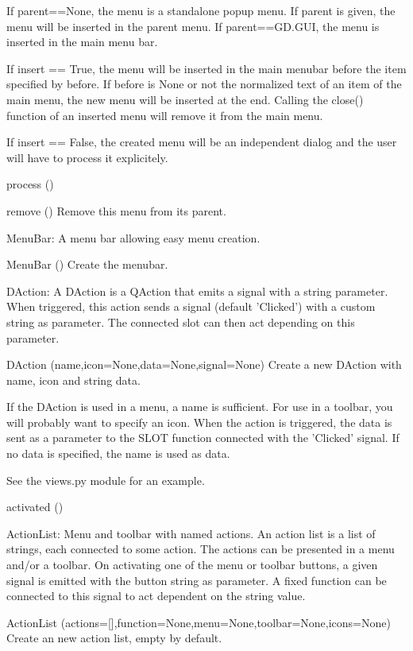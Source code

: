         If parent==None, the menu is a standalone popup menu.
        If parent is given, the menu will be inserted in the parent menu.
        If parent==GD.GUI, the menu is inserted in the main menu bar.
        
        If insert == True, the menu will be inserted in the main menubar
        before the item specified by before.
        If before is None or not the normalized text of an item of the
        main menu, the new menu will be inserted at the end.
        Calling the close() function of an inserted menu will remove it
        from the main menu.

        If insert == False, the created menu will be an independent dialog
        and the user will have to process it explicitely.
        

process ()


remove ()
Remove this menu from its parent.

MenuBar: A menu bar allowing easy menu creation.

MenuBar ()
Create the menubar.

DAction: A DAction is a QAction that emits a signal with a string parameter.
    When triggered, this action sends a signal (default 'Clicked') with a
    custom string as parameter. The connected slot can then act depending
    on this parameter.
    
DAction (name,icon=None,data=None,signal=None)
Create a new DAction with name, icon and string data.

        If the DAction is used in a menu, a name is sufficient. For use
        in a toolbar, you will probably want to specify an icon.
        When the action is triggered, the data is sent as a parameter to
        the SLOT function connected with the 'Clicked' signal.
        If no data is specified, the name is used as data. 
        
        See the views.py module for an example.
        

activated ()


ActionList: Menu and toolbar with named actions.
    An action list is a list of strings, each connected to some action.
    The actions can be presented in a menu and/or a toolbar.
    On activating one of the menu or toolbar buttons, a given signal is
    emitted with the button string as parameter. A fixed function can be
    connected to this signal to act dependent on the string value.
    
ActionList (actions=[],function=None,menu=None,toolbar=None,icons=None)
Create an new action list, empty by default.

